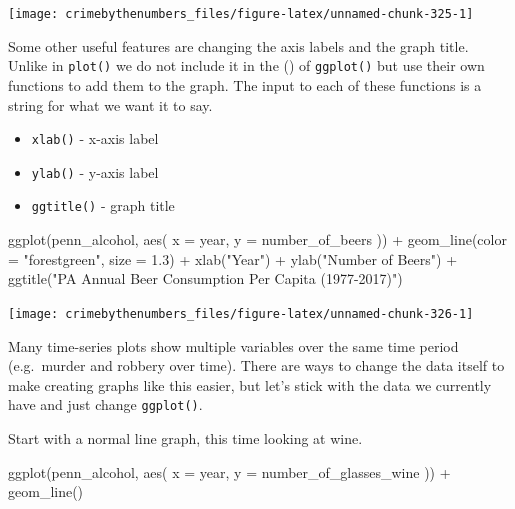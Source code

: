 \documentclass[
]{krantz}
\makeatletter
\newenvironment{Shaded}{\begin{snugshade}}{\end{snugshade}}
\newcommand{\AttributeTok}[1]{\textcolor[rgb]{0.61,0.61,0.61}{#1}}
\newcommand{\FloatTok}[1]{\textcolor[rgb]{0.06,0.06,0.06}{#1}}
\newcommand{\FunctionTok}[1]{\textcolor[rgb]{0,0,0}{#1}}
\newcommand{\NormalTok}[1]{#1}
\newcommand{\SpecialCharTok}[1]{\textcolor[rgb]{0,0,0}{#1}}
\newcommand{\StringTok}[1]{\textcolor[rgb]{0.5,0.5,0.5}{#1}}
\providecommand{\tightlist}{%
  \setlength{\itemsep}{0pt}\setlength{\parskip}{0pt}}
\newenvironment{kframe}{%
\medskip{}
\setlength{\fboxsep}{.8em}
 \def\at@end@of@kframe{}%
 \ifinner\ifhmode%
  \def\at@end@of@kframe{\end{minipage}}%
  \begin{minipage}{\columnwidth}%
 \fi\fi%
 \def\FrameCommand##1{\hskip\@totalleftmargin \hskip-\fboxsep
 \colorbox{shadecolor}{##1}\hskip-\fboxsep
     \hskip-\linewidth \hskip-\@totalleftmargin \hskip\columnwidth}%
 \MakeFramed {\advance\hsize-\width
   \@totalleftmargin\z@ \linewidth\hsize
   \@setminipage}}%
 {\par\unskip\endMakeFramed%
 \at@end@of@kframe}
\renewenvironment{Shaded}{\begin{kframe}}{\end{kframe}}
\makeatother
\begin{document}
\begin{center}\texttt{[image: crimebythenumbers\_files/figure-latex/unnamed-chunk-325-1]} \end{center}

Some other useful features are changing the axis labels and
the graph title. Unlike in \texttt{plot()} we do not include
it in the () of \texttt{ggplot()} but use their own
functions to add them to the graph. The input to each of
these functions is a string for what we want it to say.

\begin{itemize}
\tightlist
\item
  \texttt{xlab()} - x-axis label
\item
  \texttt{ylab()} - y-axis label
\item
  \texttt{ggtitle()} - graph title
\end{itemize}

\begin{Shaded}
\begin{Highlighting}[]
\FunctionTok{ggplot}\NormalTok{(penn\_alcohol, }\FunctionTok{aes}\NormalTok{(}
  \AttributeTok{x =}\NormalTok{ year,}
  \AttributeTok{y =}\NormalTok{ number\_of\_beers}
\NormalTok{)) }\SpecialCharTok{+}
  \FunctionTok{geom\_line}\NormalTok{(}\AttributeTok{color =} \StringTok{"forestgreen"}\NormalTok{, }\AttributeTok{size =} \FloatTok{1.3}\NormalTok{) }\SpecialCharTok{+}
  \FunctionTok{xlab}\NormalTok{(}\StringTok{"Year"}\NormalTok{) }\SpecialCharTok{+}
  \FunctionTok{ylab}\NormalTok{(}\StringTok{"Number of Beers"}\NormalTok{) }\SpecialCharTok{+}
  \FunctionTok{ggtitle}\NormalTok{(}\StringTok{"PA Annual Beer Consumption Per Capita (1977{-}2017)"}\NormalTok{)}
\end{Highlighting}
\end{Shaded}

\begin{center}\texttt{[image: crimebythenumbers\_files/figure-latex/unnamed-chunk-326-1]} \end{center}

Many time-series plots show multiple variables over the same
time period (e.g.~murder and robbery over time). There are
ways to change the data itself to make creating graphs like
this easier, but let's stick with the data we currently have
and just change \texttt{ggplot()}.

Start with a normal line graph, this time looking at wine.

\begin{Shaded}
\begin{Highlighting}[]
\FunctionTok{ggplot}\NormalTok{(penn\_alcohol, }\FunctionTok{aes}\NormalTok{(}
  \AttributeTok{x =}\NormalTok{ year,}
  \AttributeTok{y =}\NormalTok{ number\_of\_glasses\_wine}
\NormalTok{)) }\SpecialCharTok{+}
  \FunctionTok{geom\_line}\NormalTok{()}
\end{Highlighting}
\end{Shaded}
\end{document}
